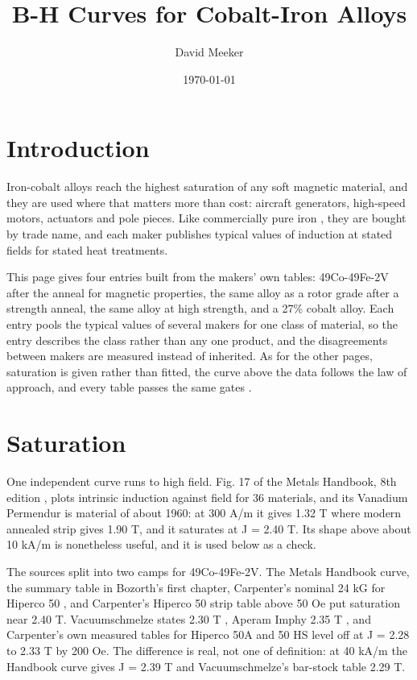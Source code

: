 \documentclass[
  11pt,
]{article}
\title{B-H Curves for Cobalt-Iron Alloys}
\author{David Meeker}
\date{\today}
\newcounter{none} %
\begin{document}
\maketitle

\section{Introduction}\label{introduction}

Iron-cobalt alloys reach the highest saturation of any soft magnetic material, and they are used where that matters more than cost: aircraft generators, high-speed motors, actuators and pole pieces. Like commercially pure iron \cite{meeker-iron}, they are bought by trade name, and each maker publishes typical values of induction at stated fields for stated heat treatments.

This page gives four entries built from the makers' own tables: 49Co-49Fe-2V after the anneal for magnetic properties, the same alloy as a rotor grade after a strength anneal, the same alloy at high strength, and a 27\% cobalt alloy. Each entry pools the typical values of several makers for one class of material, so the entry describes the class rather than any one product, and the disagreements between makers are measured instead of inherited. As for the other pages, saturation is given rather than fitted, the curve above the data follows the law of approach, and every table passes the same gates \cite{meeker-lowcarbon}.

\section{Saturation}\label{saturation}

One independent curve runs to high field. Fig. 17 of the Metals Handbook, 8th edition \cite{mh8}, plots intrinsic induction against field for 36 materials, and its Vanadium Permendur is material of about 1960: at 300 A/m it gives 1.32 T where modern annealed strip gives 1.90 T, and it saturates at J = 2.40 T. Its shape above about 10 kA/m is nonetheless useful, and it is used below as a check.

The sources split into two camps for 49Co-49Fe-2V. The Metals Handbook curve, the summary table in Bozorth's first chapter, Carpenter's nominal 24 kG for Hiperco 50 \cite{carpenter-brochure}, and Carpenter's Hiperco 50 strip table above 50 Oe \cite{carpenter-h50} put saturation near 2.40 T. Vacuumschmelze states 2.30 T \cite{vac2021,vacvf50}, Aperam Imphy 2.35 T \cite{imphy}, and Carpenter's own measured tables for Hiperco 50A and 50 HS \cite{carpenter-h50a,carpenter-h50hs} level off at J = 2.28 to 2.33 T by 200 Oe. The difference is real, not one of definition: at 40 kA/m the Handbook curve gives J = 2.39 T and Vacuumschmelze's bar-stock table 2.29 T.
\end{document}
